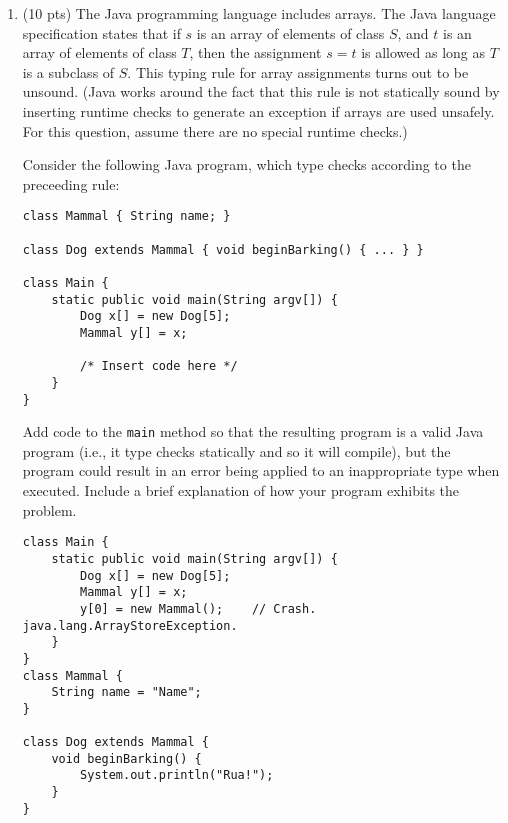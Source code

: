 \documentclass[10pt]{article}
\begin{document}
\begin{enumerate}
\medskip
\item (10 pts) The Java programming language includes arrays.  The Java
language specification states that if $s$ is an array of elements of
class $S$, and $t$ is an array of elements of class $T$, then the
assignment $s = t$ is allowed as long as $T$ is a subclass of $S$.
This typing rule for array assignments turns out to be unsound. (Java
works around the fact that this rule is not statically sound by inserting
runtime checks to generate an exception if arrays are used
unsafely. For this question, assume there are no special runtime checks.)

Consider the following Java program, which type checks according
to the preceeding rule:
\begin{verbatim}
class Mammal { String name; }

class Dog extends Mammal { void beginBarking() { ... } }

class Main {
	static public void main(String argv[]) {
		Dog x[] = new Dog[5];
		Mammal y[] = x;

		/* Insert code here */
	}
}
\end{verbatim}
Add code to the \texttt{main} method so that the resulting program is
a valid Java program (i.e., it type checks statically and so it will
compile), but the program could result in an error being applied
to an inappropriate type when executed.  Include a brief explanation
of how your program exhibits the problem.

\begin{lstlisting}
class Main {
	static public void main(String argv[]) {
		Dog x[] = new Dog[5];
		Mammal y[] = x;
		y[0] = new Mammal(); 	// Crash. java.lang.ArrayStoreException.
	}
}
class Mammal {
	String name = "Name"; 
}

class Dog extends Mammal { 
	void beginBarking() { 
		System.out.println("Rua!");
	} 
}
\end{lstlisting}


\end{enumerate}
\end{document}
